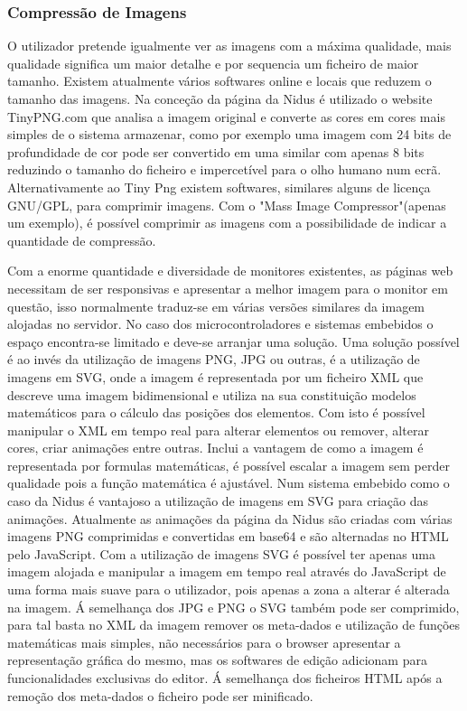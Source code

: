 \subsubsection{Compressão de Imagens}
\par

O utilizador pretende igualmente ver as imagens com a máxima qualidade, mais qualidade significa um maior detalhe e por sequencia um ficheiro de maior tamanho. Existem atualmente vários softwares online e locais que reduzem o tamanho das imagens. Na conceção da página da Nidus é utilizado o website TinyPNG.com que analisa a imagem original e converte as cores em cores mais simples de o sistema armazenar, como por exemplo uma imagem com 24 bits de profundidade de cor pode ser convertido em uma similar com apenas 8 bits reduzindo o tamanho do ficheiro e impercetível para o olho humano num ecrã\cite{Hilles2019}. Alternativamente ao Tiny Png existem softwares, similares alguns de licença GNU/GPL, para comprimir imagens. Com o "Mass Image Compressor"\cite{Mass_Image_Compressor}(apenas um exemplo), é possível comprimir as imagens com a possibilidade de indicar a quantidade de compressão.
\par
Com a enorme quantidade e diversidade de monitores existentes, as páginas web necessitam de ser responsivas e apresentar a melhor imagem para o monitor em questão, isso normalmente traduz-se em várias versões similares da imagem alojadas no servidor. No caso dos microcontroladores e sistemas embebidos o espaço encontra-se limitado e deve-se arranjar uma solução. Uma solução possível é ao invés da utilização de imagens PNG, JPG ou outras, é a utilização de imagens em SVG, onde a imagem é representada por um ficheiro XML que descreve uma imagem bidimensional e utiliza na sua constituição modelos matemáticos para o cálculo das posições dos elementos. Com isto é possível manipular o XML em tempo real para alterar elementos ou remover, alterar cores, criar animações entre outras. Inclui a vantagem de como a imagem é representada por formulas matemáticas, é possível escalar a imagem sem perder qualidade pois a função matemática é ajustável. Num sistema embebido como o caso da Nidus é vantajoso a utilização de imagens em SVG para criação das animações. Atualmente as animações da página da Nidus são criadas com várias imagens PNG comprimidas e convertidas em base64 e são alternadas no HTML pelo JavaScript. Com a utilização de imagens SVG é possível ter apenas uma imagem alojada e manipular a imagem em tempo real através do JavaScript de uma forma mais suave para o utilizador, pois apenas a zona a alterar é alterada na imagem.
Á semelhança dos JPG e PNG o SVG também pode ser comprimido, para tal basta no XML da imagem remover os meta-dados  e utilização de funções matemáticas mais simples, não necessários para o browser apresentar a representação gráfica do mesmo, mas os softwares de edição adicionam para funcionalidades exclusivas do editor. Á semelhança dos ficheiros HTML após a remoção dos meta-dados o ficheiro pode ser minificado.

